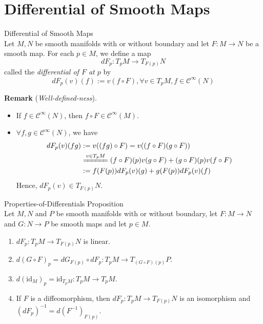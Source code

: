 \section{Differential of Smooth Maps}

\begin{definition}{Differential of Smooth Maps}\\
Let $M,N$ be smooth manifolds with or without boundary and let $F:M\to N$ be a smooth map. For each $p\in M$, we define a map
\[
dF_p: T_pM\to T_{F(p)}N
\]
called the \textit{differential of $F$ at $p$} by
\[
dF_p (v)(f) := v(f\circ F) ,\forall v\in T_pM,f\in \mathcal{C}^\infty (N)
\]
\end{definition}

\noindent\textbf{Remark} (\textit{Well-defined-ness}). \begin{itemize}
    \item If $f\in \mathcal{C}^\infty (N)$, then $f\circ F\in \mathcal{C}^\infty (M)$.
    \item $\forall f,g\in \mathcal{C}^\infty (N)$, we have
    \begin{align*}
        dF_p(v) (fg)&:= v((fg) \circ F)= v((f\circ F)(g\circ F))\\
        &\xlongequal{v\in T_pM} (f \circ F)(p) v(g\circ F)+ (g\circ F)(p) v(f\circ F)\\
        &:= f(F(p)) dF_p(v)(g)+ g(F(p)) dF_p (v) (f)
    \end{align*}
    Hence, $dF_p(v) \in T_{F(p)}N$.
\end{itemize}


\begin{proposition}{Properties-of-Differentials Proposition}\\
Let $M,N$ and $P$ be smooth manifolds with or without boundary, let $F: M\to N$ and $G:N\to P$ be smooth maps and let $p\in M$.
\begin{enumerate}
    \item $dF_p:T_p M\to T_{F(p)} N$ is linear.
    \item $d(G\circ F)_p= dG_{F(p)} \circ dF_p: T_pM\to T_{(G\circ F)(p)} P$.
    \item $d(\text{id}_M)_p= \text{id}_{T_pM}: T_pM\to T_pM$.
    \item If $F$ is a diffeomorphism, then $dF_p: T_pM\to T_{F(p)}N$ is an isomorphism and $(dF_p)^{-1}= d(F^{-1})_{F(p)}$.
\end{enumerate}
\end{proposition}


